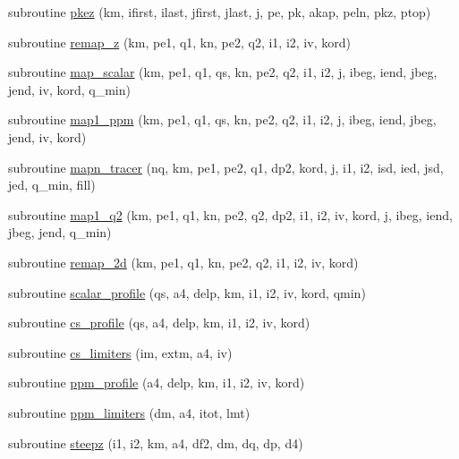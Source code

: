 \begin{DoxyCompactItemize}
\item 
subroutine \hyperlink{classfv__mapz__mod_a52443e2b2c993b75d4fdeae138398dfc}{pkez} (km, ifirst, ilast, jfirst, jlast, j, pe, pk, akap, peln, pkz, ptop)
\item 
subroutine \hyperlink{classfv__mapz__mod_a65d5b6aa4d7e599b7af0a362b9e96fd2}{remap\-\_\-z} (km, pe1, q1, kn, pe2, q2, i1, i2, iv, kord)
\item 
subroutine \hyperlink{classfv__mapz__mod_a3d1b66129cc9014f4dbad93e2b397a2e}{map\-\_\-scalar} (km, pe1, q1, qs, kn, pe2, q2, i1, i2, j, ibeg, iend, jbeg, jend, iv, kord, q\-\_\-min)
\item 
subroutine \hyperlink{classfv__mapz__mod_a35a873aa5bd84ccf2d0a71bd96b0eaff}{map1\-\_\-ppm} (km, pe1, q1, qs, kn, pe2, q2, i1, i2, j, ibeg, iend, jbeg, jend, iv, kord)
\item 
subroutine \hyperlink{classfv__mapz__mod_a90a838ddc038bd2a7d817657f5085eb2}{mapn\-\_\-tracer} (nq, km, pe1, pe2, q1, dp2, kord, j, i1, i2, isd, ied, jsd, jed, q\-\_\-min, fill)
\item 
subroutine \hyperlink{classfv__mapz__mod_ae331c105e67cfb16c4d86ff07e5fd110}{map1\-\_\-q2} (km, pe1, q1, kn, pe2, q2, dp2, i1, i2, iv, kord, j, ibeg, iend, jbeg, jend, q\-\_\-min)
\item 
subroutine \hyperlink{classfv__mapz__mod_a58e331d987fff65d9d89a1c3dfa5c5e4}{remap\-\_\-2d} (km, pe1, q1, kn, pe2, q2, i1, i2, iv, kord)
\item 
subroutine \hyperlink{classfv__mapz__mod_ae090838204207cbddd0e4d08f382f95b}{scalar\-\_\-profile} (qs, a4, delp, km, i1, i2, iv, kord, qmin)
\item 
subroutine \hyperlink{classfv__mapz__mod_a628ebb3961c9a007434cb29da18e96d6}{cs\-\_\-profile} (qs, a4, delp, km, i1, i2, iv, kord)
\item 
subroutine \hyperlink{classfv__mapz__mod_a36cfb1e4c0826ab1202a1ae5245fb6f6}{cs\-\_\-limiters} (im, extm, a4, iv)
\item 
subroutine \hyperlink{classfv__mapz__mod_a94cb1798bfac376db362e29961b22d97}{ppm\-\_\-profile} (a4, delp, km, i1, i2, iv, kord)
\item 
subroutine \hyperlink{classfv__mapz__mod_aea73a4b490462eebec46e902de4731dd}{ppm\-\_\-limiters} (dm, a4, itot, lmt)
\item 
subroutine \hyperlink{classfv__mapz__mod_a819605dd5b0423882b9ce0671f475986}{steepz} (i1, i2, km, a4, df2, dm, dq, dp, d4)
\end{DoxyCompactItemize}


